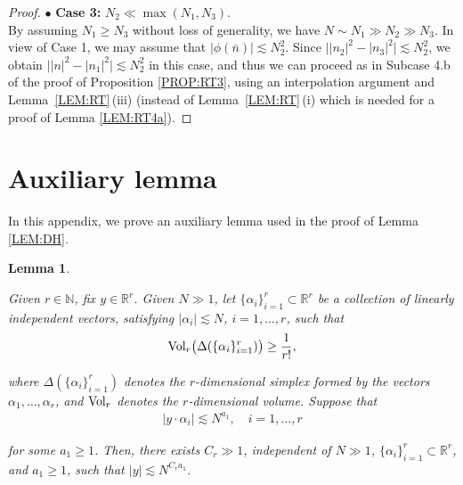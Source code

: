 \documentclass[%
11pt,  reqno]{amsart}
\newtheorem{lemma}[theorem]{Lemma}
\newcommand{\1}{\hspace{0.2mm}\text{I}\hspace{0.2mm}}
\newcommand{\noi}{\noindent}
\newcommand{\R}{\mathbb{R}}
\newcommand{\al}{\alpha}
\newcommand{\Dl}{\Delta}
\newcommand{\les}{\lesssim}
\newcommand{\N}{\mathbb{N}}
\numberwithin{equation}{section}
\numberwithin{theorem}{section}
\begin{document}
\begin{proof}
\medskip

\noi 
$\bullet$ {\bf Case 3:}
$N_2  \ll \max(N_1, N_3)$.
\\
\indent
By assuming $N_1 \ge N_3$ without loss of generality, 
we have $N\sim N_1 \gg N_2 \gg N_3$.
In view of Case 1, we may assume that 
$|\phi(\bar n)| \les  N_2^2$.
Since $\big||n_2|^2 - |n_3|^2\big| \les N_2^2$, 
we obtain
$\big||n|^2 - |n_1|^2\big| \les N_2^2$
in this case, 
and thus we can proceed as in Subcase 4.b of the proof 
of Proposition \ref{PROP:RT3}, 
using an interpolation argument
and 
Lemma~\ref{LEM:RT}\,(iii)
(instead of 
Lemma~\ref{LEM:RT}\,(i)
which is needed for a proof of 
Lemma \ref{LEM:RT4a}).
\end{proof}
	
















\appendix

















\section{Auxiliary lemma}


In this appendix, 
we prove an auxiliary lemma used in the proof of Lemma \ref{LEM:DH}.



\begin{lemma}\label{LEM:Y1}

Given $r \in \N$, fix
 $y \in \R^r$.
Given $N \gg1$, let $\{\al_i \}_{i=1}^r \subset \R^r$ be a collection of linearly independent  vectors,
 satisfying 
$ |\al_i| \les  N$, $i = 1, \dots, r$, 
such that 
\begin{align}
\textup{Vol}_r
\big(\Dl(\{\al_i\}_{i = 1}^r)\big) \ge \frac1{r!}, 
\label{aux0}
\end{align}

\noi
where $\Dl(\{\al_i\}_{i = 1}^r)$ denotes the 
$r$-dimensional simplex formed by 
the vectors $\al_1, \dots, \al_r$, 
and $\textup{Vol}_r$ denotes the $r$-dimensional volume.
Suppose that
\begin{align}
|y \cdot \al_i| \les N^{a_1}, \quad i = 1, \dots, r
\label{aux1}
\end{align}

\noi
for some $a_1 \ge 1$.
Then, there exists $C_r \gg 1$, independent of $N\gg1 $,
$\{\al_i \}_{i=1}^r \subset \R^r$,  and $a_1\ge 1$,  such that $|y| \les N^{C_r a_1}$.
\end{lemma}
\end{document}
